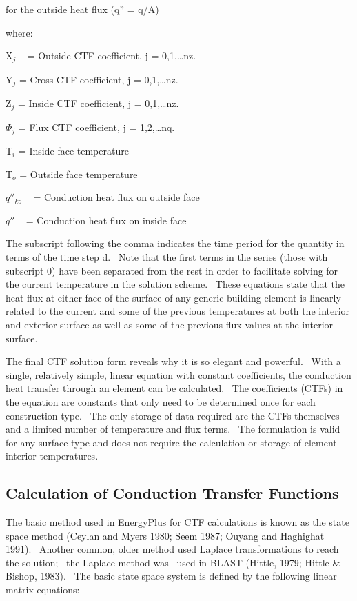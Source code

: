 for the outside heat flux (q'' = q/A)

where:

X\emph{\(_{j}\)} ~ = Outside CTF coefficient, j = 0,1,\ldots{}nz.

Y\emph{\(_{j}\)} = Cross CTF coefficient, j = 0,1,\ldots{}nz.

Z\emph{\(_{j}\)} = Inside CTF coefficient, j = 0,1,\ldots{}nz.

$\Phi$\emph{\(_{j}\)} = Flux CTF coefficient, j = 1,2,\ldots{}nq.

T\emph{\(_{i}\)} = Inside face temperature

T\emph{\(_{o}\)} = Outside face temperature

\({q''_{ko}}\) ~ = Conduction heat flux on outside face

\(q''\) ~ = Conduction heat flux on inside face

The subscript following the comma indicates the time period for the quantity in terms of the time step d.~ Note that the first terms in the series (those with subscript 0) have been separated from the rest in order to facilitate solving for the current temperature in the solution scheme.~ These equations state that the heat flux at either face of the surface of any generic building element is linearly related to the current and some of the previous temperatures at both the interior and exterior surface as well as some of the previous flux values at the interior surface.

The final CTF solution form reveals why it is so elegant and powerful.~ With a single, relatively simple, linear equation with constant coefficients, the conduction heat transfer through an element can be calculated.~ The coefficients (CTFs) in the equation are constants that only need to be determined once for each construction type.~ The only storage of data required are the CTFs themselves and a limited number of temperature and flux terms.~ The formulation is valid for any surface type and does not require the calculation or storage of element interior temperatures.

\subsection{Calculation of Conduction Transfer Functions}\label{calculation-of-conduction-transfer-functions}

The basic method used in EnergyPlus for CTF calculations is known as the state space method (Ceylan and Myers 1980; Seem 1987; Ouyang and Haghighat 1991).~ Another common, older method used Laplace transformations to reach the solution;~ the Laplace method was~ used in BLAST (Hittle, 1979; Hittle \& Bishop, 1983).~ The basic state space system is defined by the following linear matrix equations:

